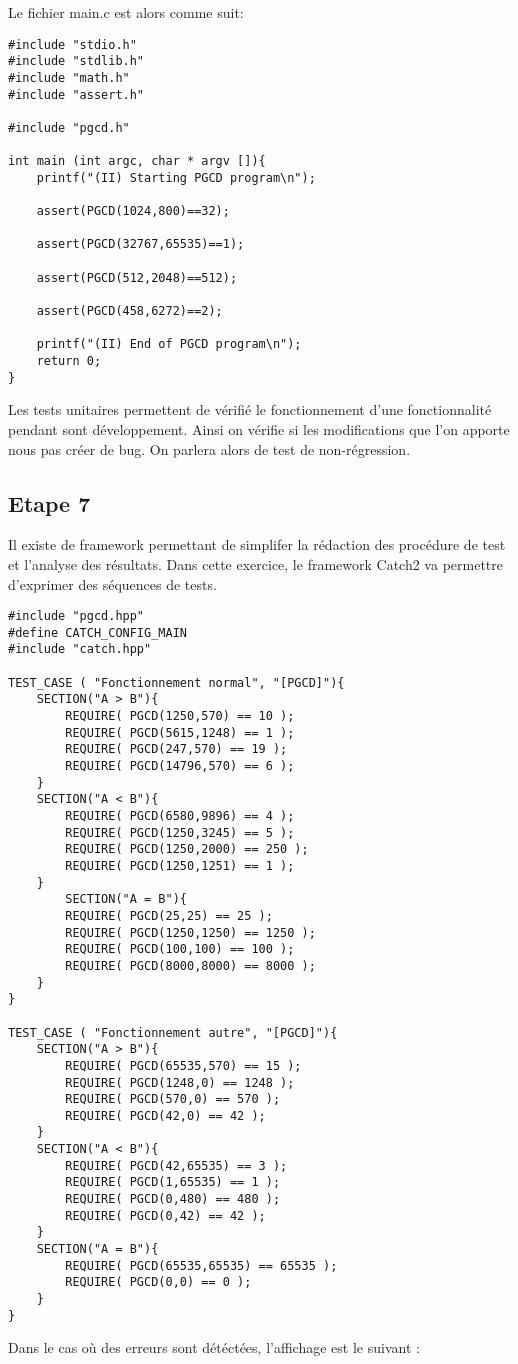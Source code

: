 \documentclass[a4paper]{article}
\begin{document}
        Le fichier main.c est alors comme suit:
\begin{lstlisting}[style=CStyle]
#include "stdio.h"
#include "stdlib.h"
#include "math.h"
#include "assert.h"

#include "pgcd.h"

int main (int argc, char * argv []){
    printf("(II) Starting PGCD program\n");

    assert(PGCD(1024,800)==32);
    
    assert(PGCD(32767,65535)==1);
    
    assert(PGCD(512,2048)==512);
    
    assert(PGCD(458,6272)==2);

    printf("(II) End of PGCD program\n");
    return 0;
}
\end{lstlisting}

        Les tests unitaires permettent de vérifié le fonctionnement d'une fonctionnalité pendant sont développement. 
        Ainsi on vérifie si les modifications que l'on apporte nous pas créer de bug.
        On parlera alors de test de non-régression.
\newpage
    \subsection{Etape 7}
        Il existe de framework permettant de simplifer la rédaction des procédure de test et l'analyse des résultats.
        Dans cette exercice, le framework Catch2 va permettre d'exprimer des séquences de tests.
\begin{lstlisting}[style=CStyle]
#include "pgcd.hpp"
#define CATCH_CONFIG_MAIN
#include "catch.hpp"

TEST_CASE ( "Fonctionnement normal", "[PGCD]"){
    SECTION("A > B"){
        REQUIRE( PGCD(1250,570) == 10 );
        REQUIRE( PGCD(5615,1248) == 1 );
        REQUIRE( PGCD(247,570) == 19 );
        REQUIRE( PGCD(14796,570) == 6 );
    }
    SECTION("A < B"){
        REQUIRE( PGCD(6580,9896) == 4 );
        REQUIRE( PGCD(1250,3245) == 5 );
        REQUIRE( PGCD(1250,2000) == 250 );
        REQUIRE( PGCD(1250,1251) == 1 );
    }
        SECTION("A = B"){
        REQUIRE( PGCD(25,25) == 25 );
        REQUIRE( PGCD(1250,1250) == 1250 );
        REQUIRE( PGCD(100,100) == 100 );
        REQUIRE( PGCD(8000,8000) == 8000 );
    }
}

TEST_CASE ( "Fonctionnement autre", "[PGCD]"){
    SECTION("A > B"){
        REQUIRE( PGCD(65535,570) == 15 );
        REQUIRE( PGCD(1248,0) == 1248 );
        REQUIRE( PGCD(570,0) == 570 );
        REQUIRE( PGCD(42,0) == 42 );
    }
    SECTION("A < B"){
        REQUIRE( PGCD(42,65535) == 3 );
        REQUIRE( PGCD(1,65535) == 1 );
        REQUIRE( PGCD(0,480) == 480 );
        REQUIRE( PGCD(0,42) == 42 );
    }
    SECTION("A = B"){
        REQUIRE( PGCD(65535,65535) == 65535 );
        REQUIRE( PGCD(0,0) == 0 );
    }
}    
\end{lstlisting}        
        Dans le cas où des erreurs sont détéctées, l'affichage est le suivant :
        
\end{document}
